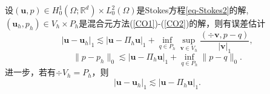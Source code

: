 \begin{theorem}\label{thm:stokeserrorestimate}
设$(\boldsymbol{u}, p)\in H_0^{1}(\Omega; \mathbb{R}^{d})\times L_{0}^{2}(\Omega)$是Stokes方程\eqref{eq-Stokes2}的解, $(\boldsymbol{u}_h, p_h)\in V_h\times P_h$是混合元方法(\ref{CO1})-(\ref{CO2})的解，则有误差估计
\begin{equation}\label{stokeserroruh}	
|\boldsymbol{u}-\boldsymbol{u}_h|_1\lesssim |\boldsymbol{u}-\Pi_{h}\boldsymbol{u}|_1 + \inf_{q\in P_h}\sup_{\boldsymbol{v}\in V_h}\frac{(\div\boldsymbol{v},p-q)}{|\boldsymbol{v}|_1},
\end{equation}
\begin{equation}\label{stokeserrorph}	
\|p-p_h\|_0\lesssim |\boldsymbol{u}-\Pi_{h}\boldsymbol{u}|_1 + \inf_{q\in P_h}\|p-q\|_0.
\end{equation}
进一步，若有$\div V_h=P_h$，则
\begin{equation}\label{stokeserroruhu}	
|\boldsymbol{u}-\boldsymbol{u}_h|_1\lesssim |\boldsymbol{u}-\Pi_{h}\boldsymbol{u}|_1.
\end{equation}
\end{theorem}

